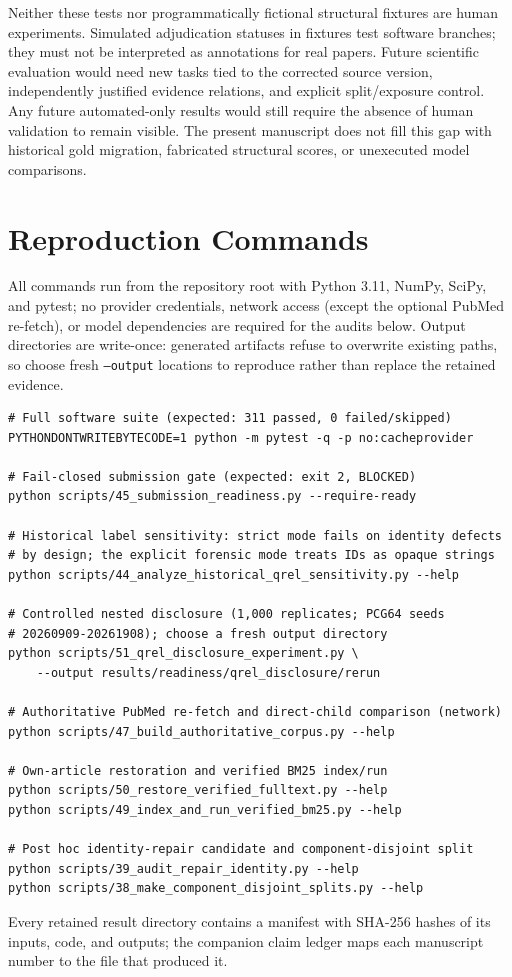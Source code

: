 Neither these tests nor programmatically fictional structural fixtures are human experiments. Simulated adjudication statuses in fixtures test software branches; they must not be interpreted as annotations for real papers. Future scientific evaluation would need new tasks tied to the corrected source version, independently justified evidence relations, and explicit split/exposure control. Any future automated-only results would still require the absence of human validation to remain visible. The present manuscript does not fill this gap with historical gold migration, fabricated structural scores, or unexecuted model comparisons.

\section{Reproduction Commands}
\label{app:repro}
All commands run from the repository root with Python 3.11, NumPy, SciPy, and pytest; no provider credentials, network access (except the optional PubMed re-fetch), or model dependencies are required for the audits below. Output directories are write-once: generated artifacts refuse to overwrite existing paths, so choose fresh \texttt{--output} locations to reproduce rather than replace the retained evidence.
{\footnotesize
\begin{verbatim}
# Full software suite (expected: 311 passed, 0 failed/skipped)
PYTHONDONTWRITEBYTECODE=1 python -m pytest -q -p no:cacheprovider

# Fail-closed submission gate (expected: exit 2, BLOCKED)
python scripts/45_submission_readiness.py --require-ready

# Historical label sensitivity: strict mode fails on identity defects
# by design; the explicit forensic mode treats IDs as opaque strings
python scripts/44_analyze_historical_qrel_sensitivity.py --help

# Controlled nested disclosure (1,000 replicates; PCG64 seeds
# 20260909-20261908); choose a fresh output directory
python scripts/51_qrel_disclosure_experiment.py \
    --output results/readiness/qrel_disclosure/rerun

# Authoritative PubMed re-fetch and direct-child comparison (network)
python scripts/47_build_authoritative_corpus.py --help

# Own-article restoration and verified BM25 index/run
python scripts/50_restore_verified_fulltext.py --help
python scripts/49_index_and_run_verified_bm25.py --help

# Post hoc identity-repair candidate and component-disjoint split
python scripts/39_audit_repair_identity.py --help
python scripts/38_make_component_disjoint_splits.py --help
\end{verbatim}
}
Every retained result directory contains a manifest with SHA-256 hashes of its inputs, code, and outputs; the companion claim ledger maps each manuscript number to the file that produced it.
